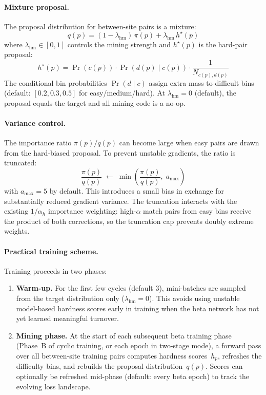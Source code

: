 \documentclass{article}
\begin{document}
\paragraph{Mixture proposal.}
The proposal distribution for between-site pairs is a mixture:
\begin{equation}
    q(p) = (1-\lambda_{\text{hm}})\,\pi(p) + \lambda_{\text{hm}}\,h^\star\!(p)
\end{equation}
where $\lambda_{\text{hm}} \in [0,1]$ controls the mining strength and $h^\star\!(p)$ is the hard-pair proposal:
\begin{equation}
    h^\star\!(p)
    =
    \Pr(c(p)) \cdot \Pr(d(p)\mid c(p)) \cdot \frac{1}{N_{c(p),d(p)}}
\end{equation}
The conditional bin probabilities $\Pr(d \mid c)$ assign extra mass to difficult bins (default: $[0.2, 0.3, 0.5]$ for easy/medium/hard). At $\lambda_{\text{hm}} = 0$ (default), the proposal equals the target and all mining code is a no-op.

\paragraph{Variance control.}
The importance ratio $\pi(p)/q(p)$ can become large when easy pairs are drawn from the hard-biased proposal. To prevent unstable gradients, the ratio is truncated:
\begin{equation}
    \frac{\pi(p)}{q(p)}
    \;\leftarrow\;
    \min\!\left(\frac{\pi(p)}{q(p)},\; a_{\max}\right)
\end{equation}
with $a_{\max} = 5$ by default. This introduces a small bias in exchange for substantially reduced gradient variance. The truncation interacts with the existing $1/\alpha_h$ importance weighting: high-$\alpha$ match pairs from easy bins receive the product of both corrections, so the truncation cap prevents doubly extreme weights.

\paragraph{Practical training scheme.}
Training proceeds in two phases:
\begin{enumerate}
    \item \textbf{Warm-up.} For the first few cycles (default 3), mini-batches are sampled from the target distribution only ($\lambda_{\text{hm}} = 0$). This avoids using unstable model-based hardness scores early in training when the beta network has not yet learned meaningful turnover.
    \item \textbf{Mining phase.} At the start of each subsequent beta training phase (Phase~B of cyclic training, or each epoch in two-stage mode), a forward pass over all between-site training pairs computes hardness scores~$h_p$, refreshes the difficulty bins, and rebuilds the proposal distribution~$q(p)$. Scores can optionally be refreshed mid-phase (default: every beta epoch) to track the evolving loss landscape.
\end{enumerate}
\end{document}
